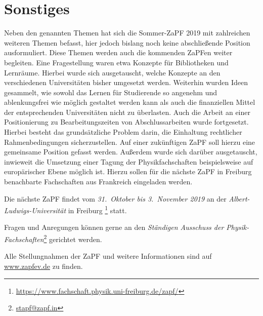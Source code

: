 \section*{Sonstiges}
Neben den genannten Themen hat sich die Sommer-ZaPF 2019 mit zahlreichen weiteren Themen befasst, hier jedoch bislang noch keine abschließende Position ausformuliert. Diese Themen werden auch die kommenden ZaPFen weiter begleiten. 
Eine Fragestellung waren etwa Konzepte für Bibliotheken und Lernräume. Hierbei wurde sich ausgetauscht, welche Konzepte an den verschiedenen Universitäten bisher umgesetzt werden. Weiterhin wurden Ideen gesammelt, wie sowohl das Lernen für Studierende so angenehm und ablenkungsfrei wie möglich gestaltet werden kann als auch die finanziellen Mittel der entsprechenden Universitäten nicht zu überlasten. 
Auch die Arbeit an einer Positionierung zu Bearbeitungszeiten von Abschlussarbeiten wurde fortgesetzt. Hierbei besteht das grundsätzliche Problem darin, die Einhaltung rechtlicher Rahmenbedingungen sicherzustellen. Auf einer zukünftigen ZaPF soll hierzu eine gemeinsame Position gefasst werden.
Außerdem wurde sich darüber ausgetauscht, inwieweit die Umsetzung einer Tagung der Physikfachschaften beispielsweise auf europärischer Ebene möglich ist. Hierzu sollen für die nächste ZaPF in Freiburg benachbarte Fachschaften aus Frankreich eingeladen werden. 

		
\vfill
		
Die nächste ZaPF findet vom \emph{31.\ Oktober bis 3.\ November 2019} an der  \emph{Albert-Ludwigs-Universität} in Freiburg \footnote{\url{https://www.fachschaft.physik.uni-freiburg.de/zapf/}} statt.
		
Fragen und Anregungen können gerne an den \emph{Ständigen Ausschuss der Physik-Fachschaften}\footnote{\href{mailto:stapf@zapf.in}{\url{stapf@zapf.in}}} gerichtet werden.
		
Alle Stellungnahmen der ZaPF und weitere Informationen sind auf \href{http://www.zapfev.de}{\url{www.zapfev.de}} zu finden.
		
		
		
		
